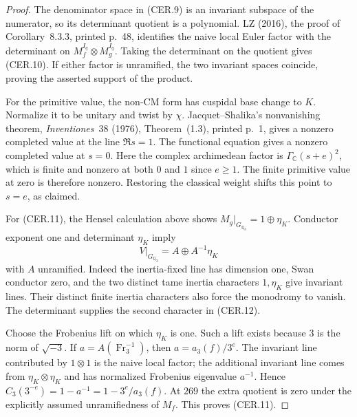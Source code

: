 \begin{proof}
The denominator space in (CER.9) is an invariant subspace
of the numerator, so its determinant quotient is a
polynomial.  LZ (2016), the proof of Corollary~8.3.3, printed
p.~48, identifies the naive local Euler factor with
the determinant on $M_f^{I_q}\otimes M_g^{I_q}$.
Taking the determinant on the quotient gives (CER.10).
If either factor is unramified, the two invariant spaces
coincide, proving the asserted support of the product.

For the primitive value, the non-CM form has cuspidal
base change to $K$.  Normalize it to be unitary and twist
by $\chi$.  Jacquet--Shalika's nonvanishing theorem,
\emph{Inventiones}~38 (1976), Theorem~(1.3), printed p.~1,
gives a nonzero completed value at the line $\Re s=1$.
The functional equation gives a nonzero completed value
at $s=0$.  Here the complex archimedean factor is
$\Gamma_{\mathbb C}(s+e)^2$, which is finite and nonzero
at both $0$ and $1$ since $e\ge1$.  The finite primitive
value at zero is therefore nonzero.  Restoring the
classical weight shifts this point to $s=e$, as claimed.

For (CER.11), the Hensel calculation above shows
$M_g|_{G_{\mathbb Q_3}}=1\oplus\eta_K$.
Conductor exponent one and determinant $\eta_K$ imply
\[
       V|_{G_{\mathbb Q_3}}=A\oplus A^{-1}\eta_K
                                                            \tag{CER.12}
\]
with $A$ unramified.  Indeed the inertia-fixed line has
dimension one, Swan conductor zero, and the two distinct
tame inertia characters $1,\eta_K$ give invariant lines.
Their distinct finite inertia characters also force the
monodromy to vanish.  The determinant supplies the second
character in (CER.12).

Choose the Frobenius lift on which $\eta_K$ is one.
Such a lift exists because $3$ is the norm of $\sqrt{-3}$.
If $a=A(\operatorname{Fr}_3^{-1})$, then
$a=a_3(f)/3^e$.  The invariant line contributed by
$1\otimes1$ is the naive local factor; the additional
invariant line comes from $\eta_K\otimes\eta_K$ and
has normalized Frobenius eigenvalue $a^{-1}$.
Hence $C_3(3^{-e})=1-a^{-1}=1-3^e/a_3(f)$.
At $269$ the extra quotient is zero under the explicitly
assumed unramifiedness of $M_f$.  This proves (CER.11).
\end{proof}


